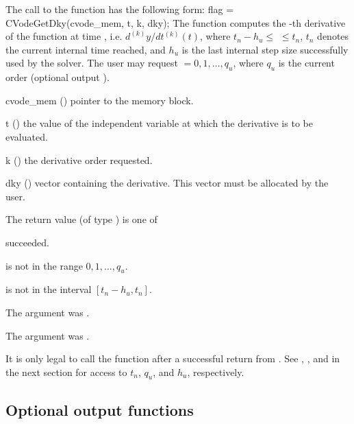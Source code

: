 The call to the  function has the following form:
{
  flag = CVodeGetDky(cvode\_mem, t, k, dky);
}
{
  The function  computes the -th derivative of the function
   at time , i.e. $d^{(k)}y/dt^{(k)} (t)$, where $t_n - h_u \le$
   $\le t_n$, $t_n$ denotes the current internal time reached, and $h_u$
  is the  last internal step size successfully used by the solver.  The
  user may request  $= 0, 1, \ldots, q_u$, where $q_u$ is the current order
  (optional output ).
}
{
  \begin{args}
  \item[cvode\_mem] ()
    pointer to the {\cvode} memory block.
  \item[t] ()  the value of the independent variable at
    which the derivative is to be evaluated.
  \item[k] () the derivative order requested.
  \item[dky] ()
    vector containing the derivative.
    This vector must be allocated by the user.
  \end{args}
}
{
  The return value  (of type ) is one of
  \begin{args}
  \item[\Id{CV\_SUCCESS}]
     succeeded.
  \item[\Id{CV\_BAD\_K}]
     is not in the range $0, 1, \ldots, q_u$.
  \item[\Id{CV\_BAD\_T}]
     is not in the interval $[t_n - h_u , t_n]$.
  \item[\Id{CV\_BAD\_DKY}]
    The  argument was .
  \item[\Id{CV\_MEM\_NULL}]
    The  argument was .
  \end{args}

}
{
  It is only legal to call the function  after a
  successful return from . See ,
  , and  in the next section for
  access to $t_n$, $q_u$, and $h_u$, respectively.
}

\subsection{Optional output functions}\label{ss:optional_output}

